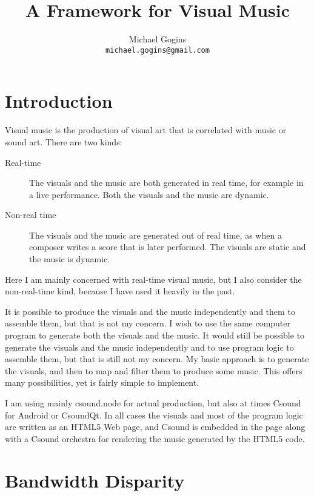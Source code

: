 \documentclass[english,11pt,letterpaper,onecolumn]{scrartcl}
\begin{document}
\frontmatter

\title{A Framework for Visual Music}
\author{Michael Gogins \\ \texttt{michael.gogins@gmail.com}}
\maketitle
\pagestyle{scrheadings}



\section{Introduction}

Visual music is the production of visual art that is correlated with music 
or sound art. There are two kinds:

\begin{description}
 \item[Real-time] The visuals and the music are both generated in real time, 
for example in a live performance. Both the visuals and the music are dynamic.
 \item[Non-real time] The visuals and the music are generated out of real 
time, as when a composer writes a score that is later performed. The visuals 
are static and the music is dynamic.
\end{description}

Here I am mainly concerned with real-time visual music, but I also consider 
the non-real-time kind, because I have used it heavily in the past.

It is possible to produce the visuals and the music independently and them to 
assemble them, but that is not my concern. I wish to use the same computer 
program to generate both the visuals and the music. It 
would still be possible to generate the visuals and the music independently and 
to use program logic to assemble them, but that is still not my concern. My 
basic approach is to generate the visuals, and then to map and filter them to 
produce some music. This offers many possibilities, yet is fairly simple to 
implement.

I am using mainly csound.node for actual production, but also at times Csound 
for Android or CsoundQt. In all cases the visuals and most of the program 
logic are written as an HTML5 Web page, and Csound is embedded in the page 
along with a Csound orchestra for rendering the music generated by the HTML5 
code.

\section{Bandwidth Disparity}
\end{document}
